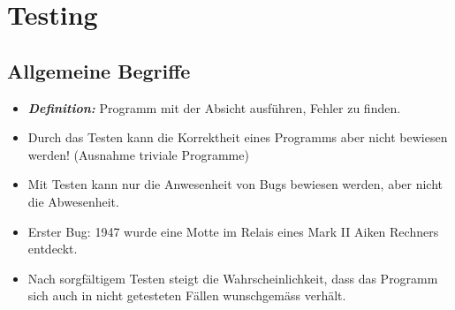 \section{Testing}
\subsection{Allgemeine Begriffe}
\begin{itemize}
	\item \textbf{\textit{Definition:}} Programm mit der Absicht ausführen, Fehler zu finden. 
	\item Durch das Testen kann die Korrektheit eines Programms aber nicht bewiesen werden! (Ausnahme triviale Programme)
	\item Mit Testen kann nur die Anwesenheit von Bugs bewiesen werden, aber nicht die Abwesenheit. 
	\item Erster Bug: 1947 wurde eine Motte im Relais eines Mark II Aiken Rechners entdeckt.
	\item Nach sorgfältigem Testen steigt die Wahrscheinlichkeit, dass das Programm sich auch in nicht getesteten Fällen wunschgemäss verhält.
\end{itemize}
